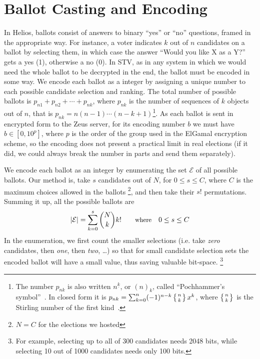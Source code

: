 \documentclass[runningheads,a4paper]{llncs}
\begin{document}
\section{Ballot Casting and Encoding}

In Helios, ballots consist of answers to binary ``yes'' or ``no''
questions, framed in the appropriate way. For instance, a voter
indicates $k$ out of $n$ candidates on a ballot by selecting them, in
which case the answer ``Would you like X as a Y?'' gets a yes (1),
otherwise a no (0). In STV, as in any system in which we would need
the whole ballot to be decrypted in the end, the ballot must be
encoded in some way. We encode each ballot as a integer by assigning a
unique number to each possible candidate selection and ranking. The
total number of possible ballots is $p _{n1} + p_{n2} + \cdots + p
_{nk}$, where $p_{nk}$ is the number of sequences of $k$ objects out
of $n$, that is $p_{nk} = n(n - 1)\cdots(n - k + 1)$\footnote{The
  number $p_{nk}$ is also written $n^{\underline{k}}$, or $(n)_k$,
  called ``Pochhammer's symbol''~\cite[p.\ 48]{graham:1994}. In closed
  form it is $p_{nk} = \sum_{k=0}^{n} (-1)^{n-k}\left\{n \atop
    k\right\}x^k$, where $\left\{n \atop k\right\}$ is the Stirling
  number of the first kind~\cite{weisstein:pochhammer}.}. As each
ballot is sent in encrypted form to the Zeus server, for its encoding
number $b$ we must have $b \in [0, 10^p]$, where $p$ is the order of
the group used in the ElGamal encryption scheme, so the encoding does
not present a practical limit in real elections (if it did, we could
always break the number in parts and send them separately).

We encode each ballot as an integer by enumerating the set
$\mathcal{E}$ of all possible ballots.
Our method is, take $s$ candidates out of $N$,
for $0\leq s \leq C$, where $C$ is the maximum choices allowed
in the ballots \footnote{$N=C$ for the elections we hosted},
and then take their $s!$ permutations.
Summing it up, all the possible ballots are
\begin{equation}
\label{eq:max_encoded}
|\mathcal{E}| = \sum^{s}_{k=0}\binom{N}{k}k! \quad
\hbox{\small where} \quad 0\leq s \leq C
\end{equation}
In the enumeration, we first count the smaller selections
(i.e. take \textit{zero} candidates,
      then \textit{one}, then \textit{two}, \ldots)
so that for small candidate selection sets the encoded
ballot will have a small value, thus saving valuable bit-space.
\footnote{
For example, selecting up to all of 300 candidates needs 2048 bits,
while selecting 10 out of 1000 candidates needs only 100 bits.}
\end{document}

